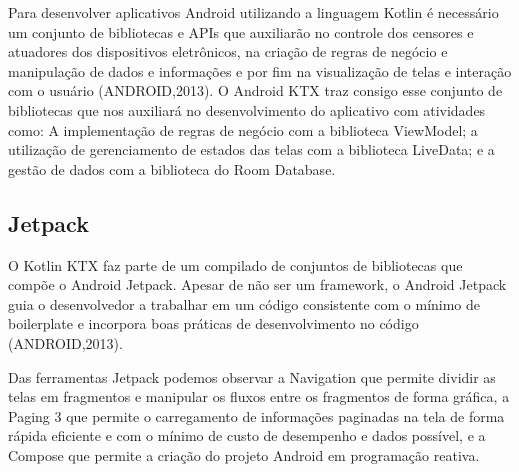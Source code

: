 Para desenvolver aplicativos Android utilizando a linguagem Kotlin é necessário um conjunto de bibliotecas e APIs que auxiliarão no controle dos censores e atuadores dos dispositivos eletrônicos, na criação de regras de negócio e manipulação de dados e informações e por fim na visualização de telas e interação com o usuário (ANDROID,2013).
O Android KTX traz consigo esse conjunto de bibliotecas que nos auxiliará no desenvolvimento do aplicativo com atividades como: A implementação de regras de negócio com a biblioteca ViewModel; a utilização de gerenciamento de estados das telas com a biblioteca LiveData; e a gestão de dados com a biblioteca do Room Database.

\subsection{Jetpack}\label{subsec:jetpack}

O Kotlin KTX faz parte de um compilado de conjuntos de bibliotecas que compõe o Android Jetpack.
Apesar de não ser um framework, o Android Jetpack guia o desenvolvedor a trabalhar em um código consistente com o mínimo de boilerplate e incorpora boas práticas de desenvolvimento no código (ANDROID,2013).

Das ferramentas Jetpack podemos observar a Navigation que permite dividir as telas em fragmentos e manipular os fluxos entre os fragmentos de forma gráfica, a Paging 3 que permite o carregamento de informações paginadas na tela de forma rápida eficiente e com o mínimo de custo de desempenho e dados possível, e a Compose que permite a criação do projeto Android em programação reativa.